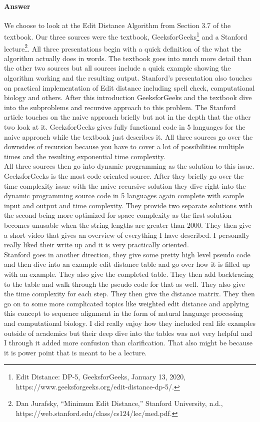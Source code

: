 \documentclass{article}
\begin{document}
\paragraph{Answer}


	We choose to look at the Edit Distance Algorithm from Section 3.7 of the textbook. Our three sources were the textbook, GeeksforGeeks\footnote{Edit Distance: DP-5, GeeksforGeeks, January 13, 2020, https://www.geeksforgeeks.org/edit-distance-dp-5/.} and a Stanford lecture\footnote{Dan Jurafsky, “Minimum Edit Distance,” Stanford University, n.d., https://web.stanford.edu/class/cs124/lec/med.pdf.}. All  three presentations begin with a quick definition of the what the algorithm actually does in words. The textbook goes into much more detail than the other two sources but all sources include a quick example showing the algorithm working and the resulting output. Stanford's presentation also touches on practical implementation of Edit distance including spell check, computational biology and others. After this introduction GeeksforGeeks and the textbook dive into the subproblems and recursive approach to this problem. The Stanford article touches on the naive approach briefly but not in the depth that the other two look at it. GeeksforGeeks gives fully functional code in 5 languages for the naive approach while the textbook just describes it. All three sources go over the downsides of recursion because you have to cover a lot of possibilities multiple times and the resulting exponential time complexity.\\
	 All three sources then go into dynamic programming as the solution to this issue. GeeksforGeeks is the most code oriented source. After they briefly go over the time complexity issue with the naive recursive solution they dive right into the dynamic programming source code in 5 languages again complete with sample input and output and time complexity. They provide two separate solutions with the second being more optimized for space complexity as the first solution becomes unusable when the string lengths are greater than 2000. They then give a short video that gives an overview of everything I have described. I personally really liked their write up and it is very practically oriented.  \\
	 Stanford goes in another direction, they give some pretty high level pseudo code and then dive into an example edit distance table and go over how it is filled up with an example. They also give the completed table. They then add backtracing to the table and walk through the pseudo code for that as well. They also give the time complexity for each step. They then give the distance matrix. They then go on to some more complicated topics like weighted edit distance and applying this concept to sequence alignment in the form of natural language processing and computational biology. I did really enjoy how they included real life examples outside of academics but their deep dive into the tables was not very helpful and I through it added more confusion than clarification. That also might be because it is power point that is meant to be a lecture.\\
\end{document}
